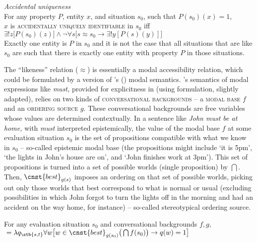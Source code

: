 \documentclass[output=paper,colorlinks,citecolor=brown,newtxmath]{langscibook}
\begin{document}
\ea \textit{Accidental uniqueness}\label{simik:def:acc-uniq}\\
For any property $P$, entity $x$, and situation $s_0$, such that $P(s_0)(x)=1$,\\
$x$ is \textsc{accidentally uniquely identifiable} in $s_0$ iff\\
$\exists!z\big[P(s_0)(z)\big]\wedge\neg\forall s\big[s\approx s_0\rightarrow\exists!y[P(s)(y)]\big]$\\
Exactly one entity is $P$ in $s_0$ and it is not the case that all situations that are like $s_0$ are such that there is exactly one entity with property $P$ in those situations.
\z

\noindent The ``likeness'' relation ($\approx$) is essentially a modal accessibility relation, which could be formulated by a version of \citeauthor{Kratzer1981}'s (\citeyear{Kratzer1981,Kratzer1991,Kratzer2012}) modal semantics. \citeauthor{Kratzer1981}'s semantics of modal expressions like \textit{must,} provided for explicitness in  (using  formulation, slightly adapted), relies on two kinds of \textsc{conversational backgrounds} -- a \textsc{modal base} $f$ and an \textsc{ordering source} $g$. These conversational backgrounds are free variables whose values are determined contextually. In a sentence like \textit{John must be at home,} with \textit{must} interpreted epistemically, the value of the modal base $f$ at some evaluation situation $s_0$ is the set of propositions compatible with what we know in $s_0$ -- so-called epistemic modal base (the propositions might include `it is 5pm', `the lights in John's house are on', and `John finishes work at 3pm'). This set of propositions is turned into a set of possible worlds (single proposition) by $\bigcap$. Then, $\cnst{best}_{g(s)}$ imposes an ordering on that set of possible worlds, picking out only those worlds that best correspond to what is normal or usual (excluding possibilities in which John forgot to turn the lights off in the morning and had an accident on the way home, for instance) -- so-called stereotypical ordering source.

\ea For any evaluation situation $s_0$ and conversational backgrounds $f,g,$
${}=\lambda q_{\stb{s,t}}\forall w\big[w\in\cnst{best}_{g(s_0)}\big(\bigcap f(s_0)\big)\rightarrow q(w)=1\big]$\label{simik:def:kratzer-must}
\z
\end{document}
